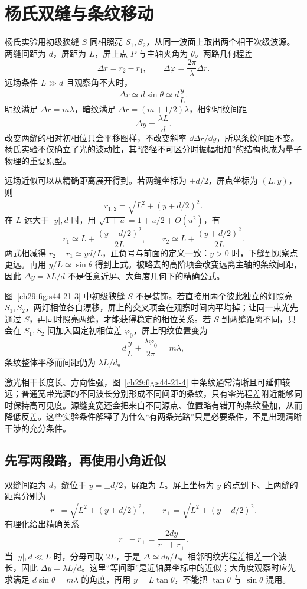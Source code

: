 \section{杨氏双缝与条纹移动}



杨氏实验用初级狭缝 $S$ 同相照亮 $S_1,S_2$，从同一波面上取出两个相干次级波源。两缝间距为 $d$，屏距为 $L$，屏上点 $P$ 与主轴夹角为 $\theta$。两路几何程差
\[
 \Delta r=r_2-r_1,\qquad
 \Delta\varphi=\frac{2\pi}{\lambda}\Delta r.
\]
远场条件 $L\gg d$ 且观察角不大时，
\begin{equation}
 \Delta r\simeq d\sin\theta\simeq d\frac yL.
\end{equation}
明纹满足 $\Delta r=m\lambda$，暗纹满足 $\Delta r=(m+1/2)\lambda$，相邻明纹间距
\begin{equation}
 \Delta y=\frac{\lambda L}{d}.
\end{equation}
改变两缝的相对初相位只会平移图样，不改变斜率 $\dd\Delta r/\dd y$，所以条纹间距不变。杨氏实验不仅确立了光的波动性，其“路径不可区分时振幅相加”的结构也成为量子物理的重要原型。

远场近似可以从精确距离展开得到。若两缝坐标为 $\pm d/2$，屏点坐标为 $(L,y)$，则
\[
 r_{1,2}=\sqrt{L^2+(y\mp d/2)^2}.
\]
在 $L$ 远大于 $|y|,d$ 时，用 $\sqrt{1+u}=1+u/2+O(u^2)$，有
\[
 r_1\simeq L+\frac{(y-d/2)^2}{2L},\qquad
 r_2\simeq L+\frac{(y+d/2)^2}{2L}.
\]
两式相减得 $r_2-r_1\simeq yd/L$，正负号与前面的定义一致：$y>0$ 时，下缝到观察点更远。再用 $y/L\simeq\sin\theta$ 得到上式。被略去的高阶项会改变远离主轴的条纹间距，因此 $\Delta y=\lambda L/d$ 不是任意近屏、大角度几何下的精确公式。

图~\ref{ch29:fig:s44-21-3} 中初级狭缝 $S$ 不是装饰。若直接用两个彼此独立的灯照亮 $S_1,S_2$，两灯相位各自漂移，屏上的交叉项会在观察时间内平均掉；让同一束光先通过 $S$，再同时照亮两缝，才能获得稳定的相位关系。若 $S$ 到两缝距离不同，只会在 $S_1,S_2$ 间加入固定初相位差 $\varphi_0$，屏上明纹位置变为
\[
 d\frac yL+\frac{\lambda\varphi_0}{2\pi}=m\lambda,
\]
条纹整体平移而间距仍为 $\lambda L/d$。

激光相干长度长、方向性强，图~\ref{ch29:fig:s44-21-4} 中条纹通常清晰且可延伸较远；普通宽带光源的不同波长分别形成不同间距的条纹，只有零光程差附近能够同时保持高可见度。源缝变宽还会把来自不同源点、位置略有错开的条纹叠加，从而降低反差。这些实验条件解释了为什么“有两条光路”只是必要条件，不是出现清晰干涉的充分条件。

\subsection{先写两段路，再使用小角近似}
双缝间距为 $d$，缝位于 $y=\pm d/2$，屏距为 $L$。屏上坐标为 $y$ 的点到下、上两缝的距离分别为
\[
 r_-=\sqrt{L^2+(y+d/2)^2},\qquad
 r_+=\sqrt{L^2+(y-d/2)^2}.
\]
有理化给出精确关系
\[
 r_--r_+=\frac{2dy}{r_-+r_+}.
\]
当 $|y|,d\ll L$ 时，分母可取 $2L$，于是 $\Delta\simeq dy/L$。相邻明纹光程差相差一个波长，因此 $\Delta y=\lambda L/d$。这里“等间距”是近轴屏坐标中的近似；大角度观察时应先求满足 $d\sin\theta=m\lambda$ 的角度，再用 $y=L\tan\theta$，不能把 $\tan\theta$ 与 $\sin\theta$ 混用。

